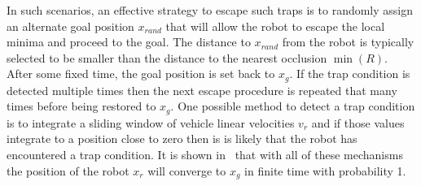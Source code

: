 In such scenarios, an effective strategy to escape such traps is to randomly assign an alternate goal position $x_{rand}$
that will allow the robot to escape the local minima and proceed to the goal. The distance to $x_{rand}$ from the robot
is typically selected to be smaller than the distance to the nearest occlusion $\min(R)$. After some fixed time, the
goal position is set back to $x_g$. If the trap condition is detected multiple times then the next escape procedure is
repeated that many times before being restored to $x_g$. One possible method to detect a trap condition is to integrate
a sliding window of vehicle linear velocities $v_r$ and if those values integrate to a position close to zero then is is likely
that the robot has encountered a trap condition. It is shown in~\cite{Krishnamurthy2007} that with all of these mechanisms the position of the robot 
$x_r$ will converge to $x_g$ in finite time with probability 1.
